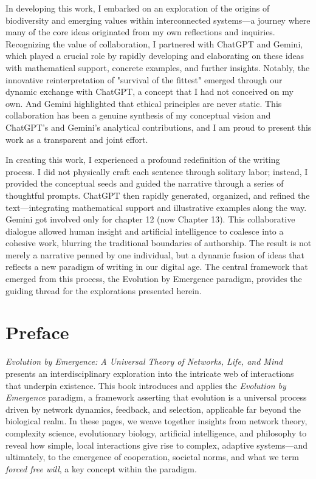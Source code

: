 \documentclass[12pt,openany]{book}
\let\cleardoublepage\clearpage %
\begin{document}
In developing this work, I embarked on an exploration of the origins of biodiversity and emerging values within interconnected systems—a journey where many of the core ideas originated from my own reflections and inquiries. Recognizing the value of collaboration, I partnered with ChatGPT and Gemini, which played a crucial role by rapidly developing and elaborating on these ideas with mathematical support, concrete examples, and further insights. Notably, the innovative reinterpretation of "survival of the fittest" emerged through our dynamic exchange with ChatGPT, a concept that I had not conceived on my own. And Gemini highlighted that ethical principles are never static. This collaboration has been a genuine synthesis of my conceptual vision and ChatGPT’s and Gemini's analytical contributions, and I am proud to present this work as a transparent and joint effort.

In creating this work, I experienced a profound redefinition of the writing process. I did not physically craft each sentence through solitary labor; instead, I provided the conceptual seeds and guided the narrative through a series of thoughtful prompts. ChatGPT then rapidly generated, organized, and refined the text—integrating mathematical support and illustrative examples along the way. Gemini got involved only for chapter 12 (now Chapter 13). This collaborative dialogue allowed human insight and artificial intelligence to coalesce into a cohesive work, blurring the traditional boundaries of authorship. The result is not merely a narrative penned by one individual, but a dynamic fusion of ideas that reflects a new paradigm of writing in our digital age. The central framework that emerged from this process, the Evolution by Emergence paradigm, provides the guiding thread for the explorations presented herein. %
\cleardoublepage

\chapter*{Preface}

\textit{Evolution by Emergence: A Universal Theory of Networks, Life, and Mind} presents an interdisciplinary exploration into the intricate web of interactions that underpin existence. This book introduces and applies the \emph{Evolution by Emergence} paradigm, a framework asserting that evolution is a universal process driven by network dynamics, feedback, and selection, applicable far beyond the biological realm. In these pages, we weave together insights from network theory, complexity science, evolutionary biology, artificial intelligence, and philosophy to reveal how simple, local interactions give rise to complex, adaptive systems—and ultimately, to the emergence of cooperation, societal norms, and what we term \emph{forced free will}, a key concept within the paradigm. %
\end{document}
